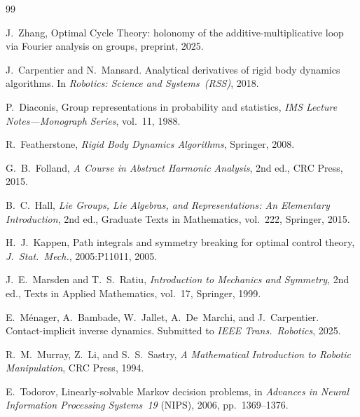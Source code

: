 \documentclass[12pt]{amsart}
\theoremstyle{definition}
\theoremstyle{remark}
\begin{document}
\begin{thebibliography}{99}

J.~Zhang,
Optimal Cycle Theory: holonomy of the additive-multiplicative loop via Fourier analysis on groups,
preprint, 2025.

J.~Carpentier and N.~Mansard.
\newblock Analytical derivatives of rigid body dynamics algorithms.
\newblock In \emph{Robotics: Science and Systems~(RSS)}, 2018.

P.~Diaconis,
Group representations in probability and statistics,
\emph{IMS Lecture Notes---Monograph Series}, vol.~11, 1988.

R.~Featherstone,
\emph{Rigid Body Dynamics Algorithms},
Springer, 2008.

G.~B.~Folland,
\emph{A Course in Abstract Harmonic Analysis}, 2nd ed.,
CRC Press, 2015.

B.~C.~Hall,
\emph{Lie Groups, Lie Algebras, and Representations: An Elementary Introduction}, 2nd ed.,
Graduate Texts in Mathematics, vol.~222, Springer, 2015.

H.~J.~Kappen,
Path integrals and symmetry breaking for optimal control theory,
\emph{J.\ Stat.\ Mech.}, 2005:P11011, 2005.

J.~E.~Marsden and T.~S.~Ratiu,
\emph{Introduction to Mechanics and Symmetry}, 2nd ed.,
Texts in Applied Mathematics, vol.~17, Springer, 1999.

E.~M\'enager, A.~Bambade, W.~Jallet, A.~De~Marchi, and J.~Carpentier.
\newblock Contact-implicit inverse dynamics.
\newblock Submitted to \emph{IEEE Trans.\ Robotics}, 2025.

R.~M.~Murray, Z.~Li, and S.~S.~Sastry,
\emph{A Mathematical Introduction to Robotic Manipulation},
CRC Press, 1994.

E.~Todorov,
Linearly-solvable Markov decision problems,
in \emph{Advances in Neural Information Processing Systems~19} (NIPS),
2006, pp.~1369--1376.

\end{thebibliography}
\end{document}
